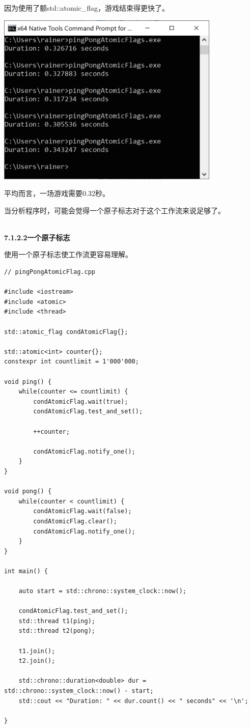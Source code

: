 因为使用了额std::atomic\_flag，游戏结束得更快了。

\begin{center}
\includegraphics[width=0.8\textwidth]{content/3/chapter7/images/3.png}\\
\end{center}

平均而言，一场游戏需要0.32秒。

当分析程序时，可能会觉得一个原子标志对于这个工作流来说足够了。

\hspace*{\fill} \\ %
\noindent
\textbf{7.1.2.2\hspace{0.2cm}一个原子标志}

使用一个原子标志使工作流更容易理解。

\begin{lstlisting}[style=styleCXX]
// pingPongAtomicFlag.cpp

#include <iostream>
#include <atomic>
#include <thread>

std::atomic_flag condAtomicFlag{};

std::atomic<int> counter{};
constexpr int countlimit = 1'000'000;

void ping() {
	while(counter <= countlimit) {
		condAtomicFlag.wait(true);
		condAtomicFlag.test_and_set();
		
		++counter;
		
		condAtomicFlag.notify_one();
	}
}

void pong() {
	while(counter < countlimit) {
		condAtomicFlag.wait(false);
		condAtomicFlag.clear();
		condAtomicFlag.notify_one();
	}
}

int main() {

	auto start = std::chrono::system_clock::now();
	
	condAtomicFlag.test_and_set();
	std::thread t1(ping);
	std::thread t2(pong);
	
	t1.join();
	t2.join();
	
	std::chrono::duration<double> dur = std::chrono::system_clock::now() - start;
	std::cout << "Duration: " << dur.count() << " seconds" << '\n';

}
\end{lstlisting}

